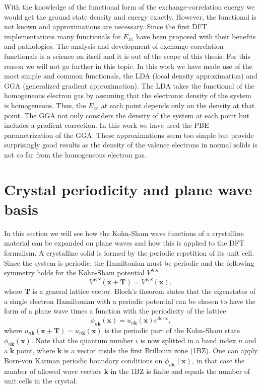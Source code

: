 With the knowledge of the functional form of the exchange-correlation energy we would get the ground state density and energy exactly. However, the functional is not known and approximations are necessary. Since the first DFT 
implementations many functionals \cite{perdew1981self,perdew1996generalized} for $E_{xc}$ have been proposed with their benefits and pathologies. The analysis and development of exchange-correlation functionals is a science on
itself and it is out of the scope of this thesis. For this reason we will not go further in this topic. In this work we have made use of the most simple and common functionals, the 
LDA\cite{perdew1981self} (local density approximation) and GGA\cite{perdew1996generalized} (generalized gradient approximation). The LDA takes the functional of the homogeneous electron gas\cite{pyne1992iterative} by assuming that 
the electronic density of the system is homogeneous. Thus, the $E_{xc}$ at each point depends only on the density at that point. The GGA not only considers the density of the system at each point but includes a gradient 
correction. In this work we have used the PBE\cite{perdew1996generalized} parametrization of the GGA. These approximations seem too simple but provide surprisingly good results as the density of the valence electrons in normal 
solids is not so far from the homogeneous electron gas\cite{martin2004electronic}.

\section{Crystal periodicity and plane wave basis}
\label{plane-wave-basis}
In this section we will see how the Kohn-Sham wave functions of a crystalline material can be expanded on plane waves and how this is applied to the DFT formalism. 
A crystalline solid is formed by the periodic repetition of its unit cell. Since the system is periodic, the Hamiltonian must be periodic and the following symmetry holds for the Kohn-Sham potential $V^{KS}$
\begin{equation}
 V^{KS}(\mathbf{x}+\mathbf{T})=V^{KS}(\mathbf{x}),
\end{equation}
where $\mathbf{T}$ is a general lattice vector. Bloch's theorem\cite{ashcroft1976solid} states that the eigenstates of a single electron Hamiltonian with a periodic potential can be chosen to have the form of a 
plane wave times a function with the periodicity of the lattice
\begin{equation}
 \phi_{n\mathbf{k}}(\mathbf{x})=u_{n\mathbf{k}}(\mathbf{x})e^{i\mathbf{k}\cdot\mathbf{x}},
\end{equation}
where $u_{n\mathbf{k}}(\mathbf{x}+\mathbf{T})=u_{n\mathbf{k}}(\mathbf{x})$ is the periodic part of the Kohn-Sham state $\phi_{n\mathbf{k}}(\mathbf{x})$. Note that the quantum number $i$ is now splitted in a band index $n$ 
and a $\mathbf{k}$ point, where $\mathbf{k}$ is a vector inside the first Brillouin zone (1BZ). One can apply Born-von Karman periodic boundary conditions\cite{ashcroft1976solid} on $\phi_{n\mathbf{k}}(\mathbf{x})$, in that case 
the number of allowed wave vectors $\mathbf{k}$ in the 1BZ is finite and equals the number of unit cells in the crystal. \\

